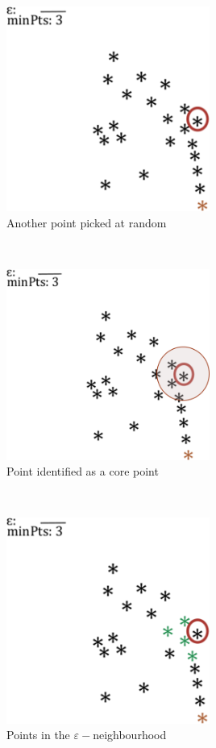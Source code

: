 \documentclass[20pt,landscape,footrule,headrule]{foils}
\begin{document}
{{\newpage\ 
\begin{center}
\includegraphics[width=0.5\textwidth]{Images/dbscan4} \\ Another point picked at random
\end{center}

\newpage\ 
\begin{center}
\includegraphics[width=0.5\textwidth]{Images/dbscan5} \\ Point identified as a core point
\end{center}

\newpage\ 
\begin{center}
\includegraphics[width=0.5\textwidth]{Images/dbscan6} \\ Points in the $\varepsilon-$neighbourhood
\end{center}

}}
\end{document}
